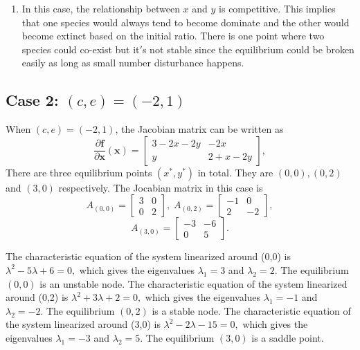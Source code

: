 \documentclass[a4paper,twocolumn]{article} %
\begin{document}
\begin{enumerate}
\item In this case, the relationship between $x$ and $y$ is competitive. This implies that one species would always tend to become dominate and the other would become extinct based on the initial ratio. There is one point where two species could co-exist but it$'$s not stable since the equilibrium could be broken easily as long as small number disturbance happens.  
\end{enumerate}

\subsection*{Case 2: $(c,e)=(-2,1)$}
When $(c,e)=(-2,1)$, the Jacobian matrix can be written as
\begin{equation*}
    \frac{\partial\textbf{f}}{\partial \textbf{x}}(\textbf{x}) =
    \left[\begin{array}{cc}
    3-2x-2y & -2x \\
    y & 2+x-2y
    \end{array}\right],
\end{equation*}
There are three equilibrium points $(x^*,y^*)$ in total. They are $(0,0),(0,2)$ and $(3,0)$ respectively. The Jocabian matrix in this case is
\begin{equation*}
    A_{(0,0)} =
    \left[\begin{array}{cc}
    3 & 0 \\
    0 & 2
    \end{array}\right], \; A_{(0,2)} =
    \left[\begin{array}{cc}
    -1 & 0 \\
    2 & -2
    \end{array}\right],   
    \end{equation*}
    \begin{equation*}
    A_{(3,0)} =
    \left[\begin{array}{cc}
    -3 & -6 \\
    0 & 5
    \end{array}\right].
\end{equation*}

The characteristic equation of the system linearized around \mbox{(0,0)} is
$\lambda^2 -5 \lambda + 6 = 0,$ which gives the eigenvalues $\lambda_{1} = 3$ and $\lambda_{2} = 2$. The equilibrium $(0,0)$ is an unstable node. 
The characteristic equation of the system linearized around \mbox{(0,2)} is $\lambda^2 +3 \lambda + 2 = 0,$ which gives the eigenvalues $\lambda_1 = -1$ and $\lambda_2 = -2$. The equilibrium $(0,2)$ is a stable node. 
The characteristic equation of the system linearized around \mbox{(3,0)} is $\lambda^2 -2 \lambda - 15 = 0,$ which gives the eigenvalues $\lambda_1 = -3$ and $\lambda_2 = 5$. The equilibrium $(3,0)$ is a saddle point.
\end{document}
